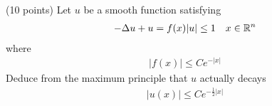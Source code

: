 (10 points)
Let $u$ be a smooth function satisfying
\begin{align*}
  -\Delta u + u = f(x) & |u| \leq 1 & x \in \mathbb{R}^n
\end{align*}
where
\begin{align*}
  |f(x)| \leq C e^{-|x|}
\end{align*}
Deduce from the maximum principle that $u$ actually decays
\begin{align*}
  |u(x)| \leq C e^{-\frac{1}{2} |x|}
\end{align*}
